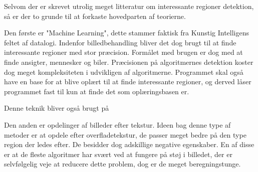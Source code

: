 {Selvom der er skrevet utrolig meget litteratur om interessante regioner
detektion, så er der to grunde til at forkaste hovedparten af teorierne.

Den første er "Machine Learning", dette stammer faktisk fra Kunstig
Intelligens feltet af datalogi. Indenfor billedbehandling bliver det dog
brugt til at finde interessante regioner med stor præcision. Formålet
med brugen er dog med at finde ansigter, mennesker og
biler\cite{ViolaJones01}\cite{SchneidermanKanade00}\cite{Gabor}. Præcisionen på
algoritmernes detektion koster dog meget kompleksiteten i udvikligen 
af algoritmerne. Programmet skal også have en base for at blive oplært
til at finde interessante regioner, og derved låser programmet fast til
kun at finde det som oplæringsbasen er.

Denne teknik bliver også brugt på 

Den anden er opdelinger af billeder efter tekstur. Ideen bag denne type
af metoder er at opdele efter
overfladetekstur\cite{218442}\cite{CarsonBelongie02}\cite{PapageorgiouPoggio}, de passer meget bedre på
den type region der ledes efter. De besidder dog adskillige
negative egenskaber. En af disse er at de fleste algoritmer har svært
ved at fungere på støj i billedet, der er selvfølgelig veje at reducere
dette problem, dog er de meget beregningstunge.\cite{PalPal}

}
